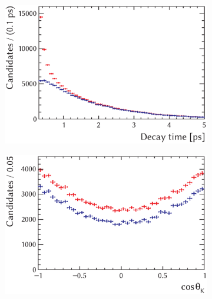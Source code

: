 \begin{figure}[p]
  \centering
  \begin{subfigure}{0.49\textwidth}
    \includegraphics[width=\textwidth]{graphics/analysis/time_bkgSub}
    \caption{}
    \label{fig:timeBkgSub}
  \end{subfigure}%
  \hfill%
  \begin{subfigure}{0.49\textwidth}
    \includegraphics[width=\textwidth]{graphics/analysis/ctk_bkgSub}
    \caption{}
    \label{fig:ctkBkgSub}
  \end{subfigure}


\end{figure}
